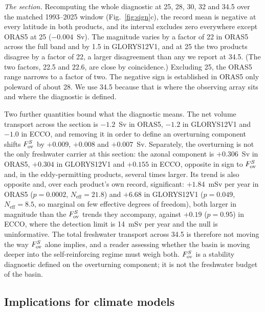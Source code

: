 \emph{The section.} Recomputing the whole diagnostic at 25, 28, 30, 32 and
34.5\degS{} over the matched 1993--2025 window (Fig.~\ref{fig:sign}c), the
record mean is negative at every latitude in both products, and its interval
excludes zero everywhere except ORAS5 at 25\degS{} ($-0.004$~Sv). The magnitude
varies by a factor of 22 in ORAS5 across the full band and by 1.5 in
GLORYS12V1, and at 25\degS{} the two products disagree by a factor of 22, a
larger disagreement than any we report at 34.5\degS{}. (The two factors, 22.5
and 22.6, are close by coincidence.) Excluding 25\degS{}, the
ORAS5 range narrows to a factor of two. The negative sign is established in
ORAS5 only poleward of about 28\degS{}. We use 34.5\degS{} because that is
where the observing array sits and where the diagnostic is defined.

Two further quantities bound what the diagnostic means. The net volume
transport across the section is $-1.2$~Sv in ORAS5, $-1.2$ in GLORYS12V1 and
$-1.0$ in ECCO, and removing it in order to define an overturning component
shifts $F_{\mathrm{ov}}^{S}$ by $+0.009$, $+0.008$ and $+0.007$~Sv. Separately, the
overturning is not the only freshwater carrier at this section: the azonal
component is $+0.306$~Sv in ORAS5, $+0.304$ in GLORYS12V1 and $+0.155$ in ECCO,
opposite in sign to $F_{\mathrm{ov}}^{S}$ and, in the eddy-permitting products, several times
larger. Its trend is also opposite and, over each product's own record,
significant: $+1.84$~mSv per year in ORAS5 ($p=0.0002$, $N_{\text{eff}}=21.8$)
and $+6.68$ in GLORYS12V1 ($p=0.049$, $N_{\text{eff}}=8.5$, so marginal on few
effective degrees of freedom), both larger in magnitude than the $F_{\mathrm{ov}}^{S}$ trends
they accompany, against $+0.19$ ($p=0.95$) in ECCO, where the
detection limit is 14~mSv per year and the null is uninformative. The total freshwater transport
across 34.5\degS{} is therefore not moving the way $F_{\mathrm{ov}}^{S}$ alone implies, and a
reader assessing whether the basin is moving deeper into the self-reinforcing
regime must weigh both. $F_{\mathrm{ov}}^{S}$ is a stability diagnostic defined on the
overturning component; it is not the freshwater budget of the basin.

\subsection*{Implications for climate models}

